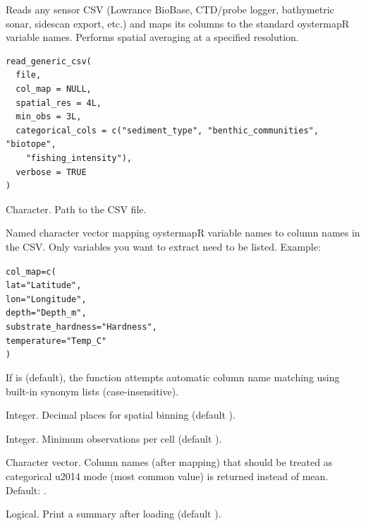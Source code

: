 \documentclass[a4paper]{book}
\begin{document}
%
\begin{Description}
Reads any sensor CSV (Lowrance BioBase, CTD/probe logger, bathymetric sonar,
sidescan export, etc.) and maps its columns to the standard oystermapR
variable names. Performs spatial averaging at a specified resolution.
\end{Description}
%
\begin{Usage}
\begin{verbatim}
read_generic_csv(
  file,
  col_map = NULL,
  spatial_res = 4L,
  min_obs = 3L,
  categorical_cols = c("sediment_type", "benthic_communities", "biotope",
    "fishing_intensity"),
  verbose = TRUE
)
\end{verbatim}
\end{Usage}
%
\begin{Arguments}
\begin{ldescription}
\item[\code{file}] Character. Path to the CSV file.

\item[\code{col\_map}] Named character vector mapping oystermapR variable names to
column names in the CSV. Only variables you want to extract need to be
listed. Example:

\begin{alltt}col_map = c(
  lat                 = "Latitude",
  lon                 = "Longitude",
  depth               = "Depth_m",
  substrate_hardness  = "Hardness",
  temperature         = "Temp_C"
)
\end{alltt}


If  is  (default), the function attempts automatic column
name matching using built-in synonym lists (case-insensitive).

\item[\code{spatial\_res}] Integer. Decimal places for spatial binning (default ).

\item[\code{min\_obs}] Integer. Minimum observations per cell (default ).

\item[\code{categorical\_cols}] Character vector. Column names (after mapping) that
should be treated as categorical \bsl{}u2014 mode (most common value) is returned
instead of mean. Default: .

\item[\code{verbose}] Logical. Print a summary after loading (default ).
\end{ldescription}
\end{Arguments}
\end{document}
